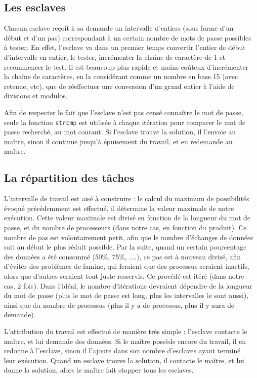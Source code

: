 \documentclass[a4paper,11pt]{article}
\begin{document}
\subsection{Les esclaves}
Chacun esclave reçoit à sa demande un intervalle d'entiers (sous forme d'un début et d'un pas) correspondant à un certain nombre de mots de passe possibles à tester.
En effet, l'esclave va dans un premier temps convertir l'entier de début d'intervalle en entier, le tester, incrémenter la chaîne de caractère de 1 et recommencer le test.
Il est beaucoup plus rapide et moins coûteux d'incrémenter la chaîne de caractères, en la considérant comme un nombre en base 15 (avec retenue, etc), que de réeffectuer une conversion d'un grand entier à l'aide de divisions et modulos.

Afin de respecter le fait que l'esclave n'est pas censé connaître le mot de passe, seule la fonction \texttt{strcmp} est utilisée à chaque itération pour comparer le mot de passe recherché, au mot courant.
Si l'esclave trouve la solution, il l'envoie au maître, sinon il continue jusqu'à épuisement du travail, et en redemande au maître.


\subsection{La répartition des tâches}
L'intervalle de travail est aisé à construire : le calcul du maximum de possibilités évoqué précédemment est effectué, il détermine la valeur maximale de notre exécution.
Cette valeur maximale est divisé en fonction de la longueur du mot de passe, et du nombre de processeurs (dans notre cas, en fonction du produit).
Ce nombre de pas est volontairement petit, afin que le nombre d'échanges de données soit au début le plus réduit possible.
Par la suite,  quand un certain pourcentage des données a été consommé (50\%, 75\%, ....), ce pas est à nouveau divisé, afin d'éviter des problèmes de famine, qui feraient que des processus seraient inactifs, alors que d'autres seraient tout juste resservis.
Ce procédé est itéré (dans notre cas, 2 fois). Dans l'idéal, le nombre d'itérations devraient dépendre de la longueur du mot de passe (plus le mot de passe est long, plus les intervalles le sont aussi), ainsi que du nombre de processus (plus il y a de processus, plus il y aura de demande).

L'attribution du travail est effectué de manière très simple : l'esclave contacte le maître, et lui demande des données.
Si le maître possède encore du travail, il en redonne à l'esclave, sinon il l'ajoute dans son nombre d'esclaves ayant terminé leur exécution.
Quand un esclave trouve la solution, il contacte le maître, et lui donne la solution, alors le maître fait stopper tous les esclaves.
\end{document}
